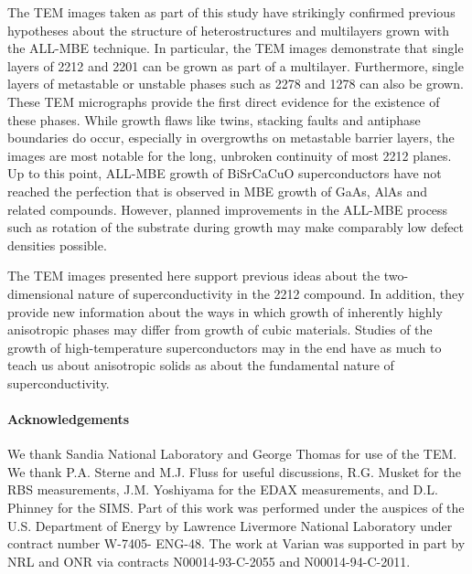 The TEM images taken as part of this study have strikingly confirmed
previous hypotheses about the structure of heterostructures and
multilayers grown with the ALL-MBE technique.  In particular, the TEM
images demonstrate that single layers of 2212 and 2201 can be grown as
part of a multilayer.  Furthermore, single layers of metastable or
unstable phases such as 2278 and 1278 can also be grown.  These TEM
micrographs provide the first direct evidence for the existence of
these phases. While growth flaws like twins, stacking faults and
antiphase boundaries do occur, especially in overgrowths on metastable
barrier layers, the images are most notable for the long, unbroken
continuity of most 2212 planes.  Up to this point, ALL-MBE growth of
BiSrCaCuO superconductors have not reached the perfection that is
observed in MBE growth of GaAs, AlAs and related compounds.  However,
planned improvements in the ALL-MBE process such as rotation of the
substrate during growth may make comparably low defect densities
possible.

The TEM images presented here support previous ideas about the
two-dimensional nature of superconductivity in the 2212
compound.\cite{bozovic} In addition, they provide new information
about the ways in which growth of inherently highly anisotropic phases
may differ from growth of cubic materials.  Studies of the growth of
high-temperature superconductors may in the end have as much to teach
us about anisotropic solids as about the fundamental nature of
superconductivity.



\paragraph*{Acknowledgements}

We thank Sandia National Laboratory and George Thomas for use of the
TEM.  We thank P.A. Sterne and M.J. Fluss for useful discussions,
R.G. Musket for the RBS measurements, J.M. Yoshiyama for the EDAX
measurements, and D.L. Phinney for the SIMS.  Part of this work was
performed under the auspices of the U.S. Department of Energy by
Lawrence Livermore National Laboratory under contract number W-7405-
ENG-48.  The work at Varian was supported in part by NRL and ONR via
contracts N00014-93-C-2055 and N00014-94-C-2011.


\clearpage

